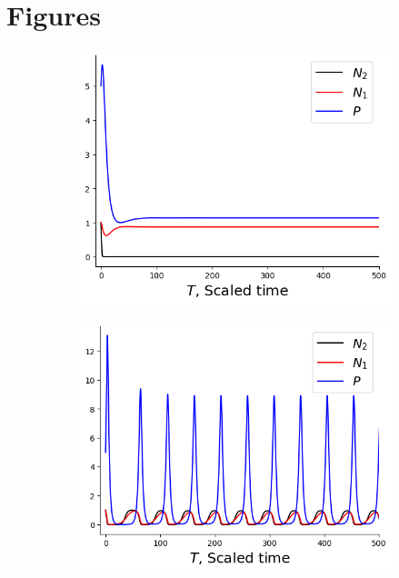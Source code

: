 \section{Figures}


\begin{figure}[htbp]
\centering
\begin{subfigure}[b]{.35 \textwidth}
	\centering
	\caption{}
	\includegraphics[width=\textwidth]{Figures/params_pop1_onex_1_plotall.png}
	\label{fig_onex_1}
\end{subfigure}
\begin{subfigure}[b]{.35 \textwidth}
	\centering
	\caption{}
	\includegraphics[width=\textwidth]{Figures/params_pop1_onex_2_plotall.png}

\end{subfigure}
\end{figure}
